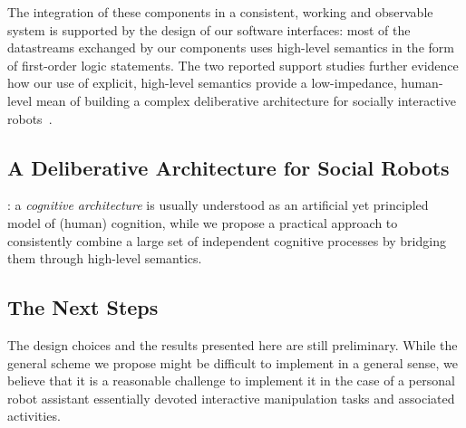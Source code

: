 \documentclass[preprint,3p,times]{elsarticle}
\begin{document}
The integration of these components in a consistent, working and observable
system is supported by the design of our software interfaces: most of the
datastreams exchanged by our components uses high-level semantics in the form of
first-order logic statements. The two reported support studies further evidence
how our use of explicit, high-level semantics provide a low-impedance,
human-level mean of building a complex deliberative
architecture for socially interactive robots~\cite{Lemaignan2013}.

\subsection{A Deliberative Architecture for Social Robots}


: a \emph{cognitive
architecture} is usually understood as an artificial yet principled model of (human)
cognition, while we propose a practical approach to consistently combine a large
set of independent cognitive processes by bridging them through high-level semantics.

\subsection{The Next Steps}


The design choices and the results presented here are still preliminary.
While the general scheme we propose might be difficult to implement in
a general sense, we believe that it is a reasonable challenge to
implement it in the case of a personal robot assistant essentially
devoted interactive manipulation
tasks and associated activities.
\end{document}
